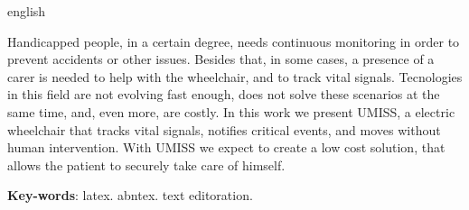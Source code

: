 \begin{resumo}[Abstract]
\begin{otherlanguage*}{english}

Handicapped people, in a certain degree, needs continuous monitoring in
order to prevent accidents or other issues. Besides that, in some cases, a
presence of a carer is needed to help with the wheelchair, and to track vital
signals.
Tecnologies in this field are not evolving fast enough, does not solve
these scenarios at the same time, and, even more, are costly.
In this work we present UMISS, a electric wheelchair that tracks vital
signals, notifies critical events, and moves without human intervention.
With UMISS we expect to create a low cost solution, that allows the
patient to securely take care of himself.


   \vspace{\onelineskip}
   \noindent 
   \textbf{Key-words}: latex. abntex. text editoration.
 \end{otherlanguage*}
\end{resumo}
